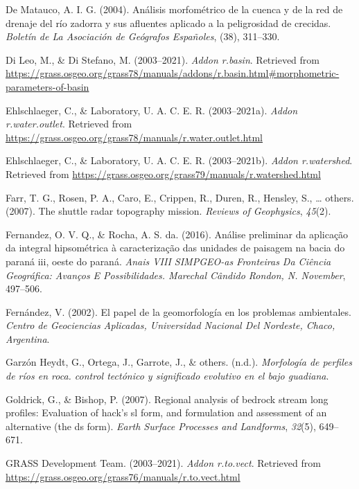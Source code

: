 \documentclass[11pt,]{article}
\begin{document}
\hypertarget{ref-de2004analisis}{}
De Matauco, A. I. G. (2004). Análisis morfométrico de la cuenca y de la
red de drenaje del río zadorra y sus afluentes aplicado a la
peligrosidad de crecidas. \emph{Boletín de La Asociación de Geógrafos
Españoles}, (38), 311--330.

\hypertarget{ref-basinmargherita}{}
Di Leo, M., \& Di Stefano, M. (2003--2021). \emph{Addon r.basin}.
Retrieved from
\url{https://grass.osgeo.org/grass78/manuals/addons/r.basin.html\#morphometric-parameters-of-basin}

\hypertarget{ref-wateroutlet}{}
Ehlschlaeger, C., \& Laboratory, U. A. C. E. R. (2003--2021a).
\emph{Addon r.water.outlet}. Retrieved from
\url{https://grass.osgeo.org/grass78/manuals/r.water.outlet.html}

\hypertarget{ref-watershedcharles}{}
Ehlschlaeger, C., \& Laboratory, U. A. C. E. R. (2003--2021b).
\emph{Addon r.watershed}. Retrieved from
\url{https://grass.osgeo.org/grass79/manuals/r.watershed.html}

\hypertarget{ref-farr2007shuttle}{}
Farr, T. G., Rosen, P. A., Caro, E., Crippen, R., Duren, R., Hensley,
S., \ldots{} others. (2007). The shuttle radar topography mission.
\emph{Reviews of Geophysics}, \emph{45}(2).

\hypertarget{ref-fernandez2016analise}{}
Fernandez, O. V. Q., \& Rocha, A. S. da. (2016). Análise preliminar da
aplicação da integral hipsométrica à caracterização das unidades de
paisagem na bacia do paraná iii, oeste do paraná. \emph{Anais VIII
SIMPGEO-as Fronteiras Da Ciência Geográfica: Avanços E Possibilidades.
Marechal Cândido Rondon, N. November}, 497--506.

\hypertarget{ref-fernandez2002papel}{}
Fernández, V. (2002). El papel de la geomorfología en los problemas
ambientales. \emph{Centro de Geociencias Aplicadas, Universidad Nacional
Del Nordeste, Chaco, Argentina}.

\hypertarget{ref-garzonmorfologia}{}
Garzón Heydt, G., Ortega, J., Garrote, J., \& others. (n.d.).
\emph{Morfología de perfiles de ríos en roca. control tectónico y
significado evolutivo en el bajo guadiana}.

\hypertarget{ref-goldrick2007regional}{}
Goldrick, G., \& Bishop, P. (2007). Regional analysis of bedrock stream
long profiles: Evaluation of hack's sl form, and formulation and
assessment of an alternative (the ds form). \emph{Earth Surface
Processes and Landforms}, \emph{32}(5), 649--671.

\hypertarget{ref-tovect}{}
GRASS Development Team. (2003--2021). \emph{Addon r.to.vect}. Retrieved
from \url{https://grass.osgeo.org/grass76/manuals/r.to.vect.html}
\end{document}
